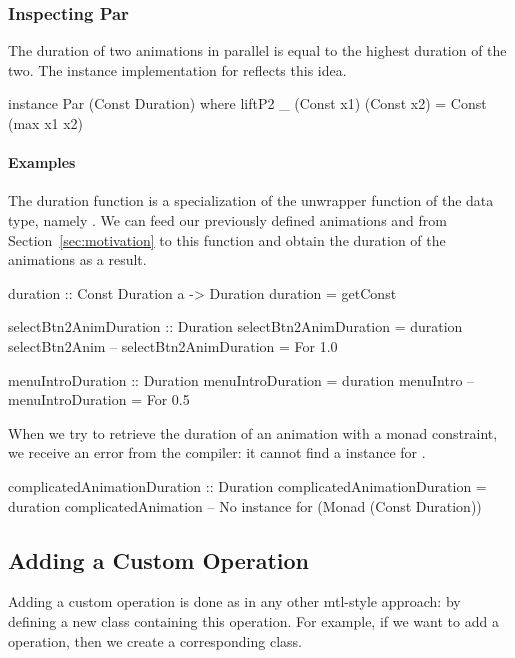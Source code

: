 \subsubsection{Inspecting Par}

The duration of two animations in parallel is equal to the highest duration of the two. The  instance implementation for  reflects this idea. 

\begin{code}
instance Par (Const Duration) where
  liftP2 _ (Const x1) (Const x2) = Const (max x1 x2)
\end{code}

\paragraph{Examples}

The duration function is a specialization of the unwrapper function of the  data type, namely . We can feed our previously defined animations  and  from Section~\ref{sec:motivation} to this function and obtain the duration of the animations as a result.

\begin{code}
duration :: Const Duration a -> Duration
duration = getConst

selectBtn2AnimDuration :: Duration
selectBtn2AnimDuration = duration selectBtn2Anim
-- selectBtn2AnimDuration = For 1.0

menuIntroDuration :: Duration
menuIntroDuration = duration menuIntro
-- menuIntroDuration = For 0.5
\end{code}

When we try to retrieve the duration of an animation with a monad constraint, we receive an error from the compiler: it cannot find a  instance for .

\begin{spec}
complicatedAnimationDuration :: Duration
complicatedAnimationDuration = duration complicatedAnimation
-- No instance for (Monad (Const Duration))
\end{spec}

\subsection{Adding a Custom Operation}

Adding a custom operation is done as in any other mtl-style approach: by defining a new class containing this operation. For example, if we want to add a  operation, then we create a corresponding  class.

